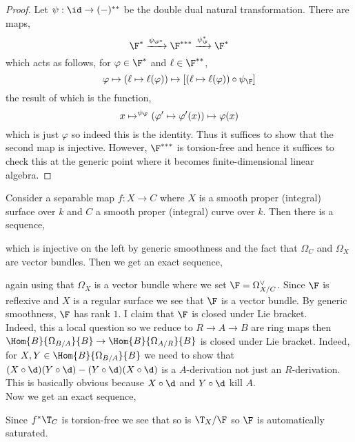 \documentclass[12pt]{article}
\begin{document}
\begin{proof}
Let $\psi : \id \to (-)^{* *}$ be the double dual natural transformation.
There are maps,
\[ \F^* \xrightarrow{\psi_{\F^*}} \F^{***} \xrightarrow{\psi_{\F}^*} \F^* \]
which acts as follows, for $\varphi \in \F^*$ and $\ell \in \F^{**}$,
\[ \varphi \mapsto (\ell \mapsto \ell(\varphi)) \mapsto [(\ell \mapsto \ell(\varphi)) \circ \psi_{\F}]   \]
the result of which is the function,
\[ x \mapsto^{\psi_{\F}} (\varphi' \mapsto \varphi'(x)) \mapsto \varphi(x) \]
which is just $\varphi$ so indeed this is the identity. Thus it suffices to show that the second map is injective. However, $\F^{***}$ is torsion-free and hence it suffices to check this at the generic point where it becomes finite-dimensional linear algebra. 
\end{proof}

Consider a separable map $f : X \to C$ where $X$ is a smooth proper (integral) surface over $k$ and $C$ a smooth proper (integral) curve over $k$. Then there is a sequence,
\begin{center}
\end{center} 
which is injective on the left by generic smoothness and the fact that $\Omega_C$ and $\Omega_X$ are vector bundles. Then we get an exact sequence,
\begin{center}
\end{center}
again using that $\Omega_X$ is a vector bundle where we set $\F = \Omega_{X/C}^\vee$. Since $\F$ is reflexive and $X$ is a regular surface we see that $\F$ is a vector bundle. By generic smoothness, $\F$ has rank $1$. I claim that $\F$ is closed under Lie bracket. 
\bigskip\\
Indeed, this a local question so we reduce to $R  \to A \to B$ are ring maps then $\Hom{B}{\Omega_{B/A}}{B} \to \Hom{B}{\Omega_{A/R}}{B}$ is closed under Lie bracket. Indeed, for $X, Y \in \Hom{B}{\Omega_{B/A}}{B}$ we need to show that $(X \circ \d) (Y \circ \d) - (Y \circ \d) (X \circ \d)$ is a $A$-derivation not just an $R$-derivation. This is basically obvious because $X \circ \d$ and $Y \circ \d$ kill $A$. 
\bigskip\\
Now we get an exact sequence,
\begin{center}
\end{center}
Since $f^* \T_C$ is torsion-free we see that so is $\T_X / \F$ so $\F$ is automatically saturated. 
\end{document}
